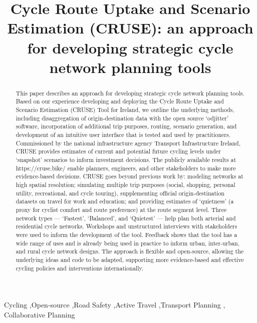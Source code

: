 \documentclass[
  super,
  preprint,
  3p]{elsarticle}
\begin{document}
\begin{frontmatter}
\title{Cycle Route Uptake and Scenario Estimation (CRUSE): an approach
for developing strategic cycle network planning tools}
        
\begin{abstract}
This paper describes an approach for developing strategic cycle network
planning tools. Based on our experience developing and deploying the
Cycle Route Uptake and Scenario Estimation (CRUSE) Tool for Ireland, we
outline the underlying methods, including disaggregation of
origin-destination data with the open source `odjitter' software,
incorporation of additional trip purposes, routing, scenario generation,
and development of an intuitive user interface that is tested and used
by practitioners. Commissioned by the national infrastructure agency
Transport Infrastructure Ireland, CRUSE provides estimates of current
and potential future cycling levels under `snapshot' scenarios to inform
investment decisions. The publicly available results at
https://cruse.bike/ enable planners, engineers, and other stakeholders
to make more evidence-based decisions. CRUSE goes beyond previous work
by: modeling networks at high spatial resolution; simulating multiple
trip purposes (social, shopping, personal utility, recreational, and
cycle touring), supplementing official origin-destination datasets on
travel for work and education; and providing estimates of `quietness' (a
proxy for cyclist comfort and route preference) at the route segment
level. Three network types --- `Fastest', `Balanced', and `Quietest' ---
help plan both arterial and residential cycle networks. Workshops and
unstructured interviews with stakeholders were used to inform the
development of the tool. Feedback shows that the tool has a wide range
of uses and is already being used in practice to inform urban,
inter-urban, and rural cycle network designs. The approach is flexible
and open-source, allowing the underlying ideas and code to be adapted,
supporting more evidence-based and effective cycling policies and
interventions internationally.
\end{abstract}





\begin{keyword}
    Cycling \sep Open-source \sep Road Safety \sep Active
Travel \sep Transport Planning \sep 
    Collaborative Planning
\end{keyword}
\end{frontmatter}
    
\end{document}
